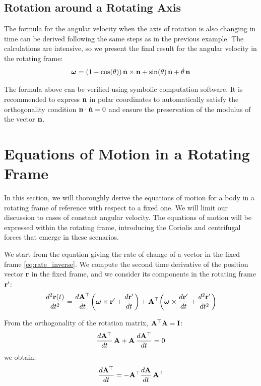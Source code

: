 \documentclass[12pt]{article}
\begin{document}
\subsection{Rotation around a Rotating Axis}

The formula for the angular velocity when the axis of rotation is also changing in time can be
derived following the same steps as in the previous example. The calculations are intensive,
so we present the final result for the angular velocity in the rotating frame:
\begin{equation}
  \boldsymbol{\omega} = (1-\cos(\theta))\,\dot{\vb{n}}\times\vb{n}
    + \sin(\theta)\,\dot{\vb{n}} + \dot\theta\,\vb{n}
  \label{eq:angular_velocity_rotating}
\end{equation}

The formula above can be verified using symbolic computation software. It is recommended to
express $\vb{n}$ in polar coordinates to automatically satisfy the orthogonality condition
$\vb{n}\cdot\dot{\vb{n}} = 0$ and ensure the preservation of the modulus of the vector
$\vb{n}$.

\section{Equations of Motion in a Rotating Frame}

In this section, we will thoroughly derive the equations of motion for a body in a rotating
frame of reference with respect to a fixed one. We will limit our discussion to cases of
constant angular velocity. The equations of motion will be expressed within the rotating
frame, introducing the Coriolis and centrifugal forces that emerge in these scenarios.

We start from the equation giving the rate of change of a vector in the fixed frame
\eqref{eq:rate_inverse}. We compute the second time derivative of the position vector
$\vb{r}$ in the fixed frame, and we consider its components in the rotating frame $\vb{r}'$:
\begin{equation}
  \frac{d^2\vb{r}(t)}{dt^2} =
    \frac{d\vb{A}^\top}{dt}\!\left(\boldsymbol{\omega}\times\vb{r}' + \frac{d\vb{r}'}{dt}\right)
    + \vb{A}^\top\!\left(\boldsymbol{\omega}\times\frac{d\vb{r}'}{dt} + \frac{d^2\vb{r}'}{dt^2}\right)
\end{equation}

From the orthogonality of the rotation matrix, $\vb{A}^\top\vb{A} = \vb{I}$:
\begin{equation}
  \frac{d\vb{A}^\top}{dt}\,\vb{A} + \vb{A}\,\frac{d\vb{A}^\top}{dt} = 0
\end{equation}
we obtain:
\begin{equation}
  \frac{d\vb{A}^\top}{dt} = -\vb{A}^\top\frac{d\vb{A}}{dt}\,\vb{A}^\top
\end{equation}
\end{document}
